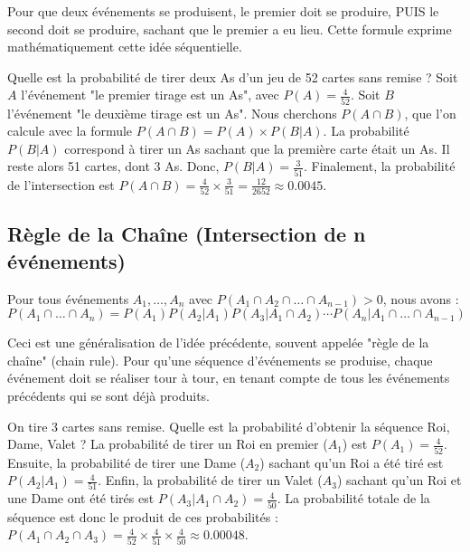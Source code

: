 \begin{intuitionbox}
Pour que deux événements se produisent, le premier doit se produire, PUIS le second doit se produire, sachant que le premier a eu lieu. Cette formule exprime mathématiquement cette idée séquentielle.
\end{intuitionbox}

\begin{examplebox}
Quelle est la probabilité de tirer deux As d'un jeu de 52 cartes sans remise ?
Soit $A$ l'événement "le premier tirage est un As", avec $P(A) = \frac{4}{52}$. Soit $B$ l'événement "le deuxième tirage est un As". Nous cherchons $P(A \cap B)$, que l'on calcule avec la formule $P(A \cap B) = P(A) \times P(B|A)$. La probabilité $P(B|A)$ correspond à tirer un As sachant que la première carte était un As. Il reste alors 51 cartes, dont 3 As. Donc, $P(B|A) = \frac{3}{51}$. Finalement, la probabilité de l'intersection est $P(A \cap B) = \frac{4}{52} \times \frac{3}{51} = \frac{12}{2652} \approx 0.0045$.
\end{examplebox}

\subsection{Règle de la Chaîne (Intersection de n événements)}

\begin{theorembox}
Pour tous événements $A_1, \dots, A_n$ avec $P(A_1 \cap A_2 \cap \dots \cap A_{n-1}) > 0$, nous avons :
$$P(A_1 \cap \dots \cap A_n) = P(A_1)P(A_2|A_1)P(A_3|A_1 \cap A_2) \cdots P(A_n|A_1 \cap \dots \cap A_{n-1})$$
\end{theorembox}

\begin{intuitionbox}
Ceci est une généralisation de l'idée précédente, souvent appelée "règle de la chaîne" (chain rule). Pour qu'une séquence d'événements se produise, chaque événement doit se réaliser tour à tour, en tenant compte de tous les événements précédents qui se sont déjà produits.
\end{intuitionbox}

\begin{examplebox}
On tire 3 cartes sans remise. Quelle est la probabilité d'obtenir la séquence Roi, Dame, Valet ?
La probabilité de tirer un Roi en premier ($A_1$) est $P(A_1) = \frac{4}{52}$.
Ensuite, la probabilité de tirer une Dame ($A_2$) sachant qu'un Roi a été tiré est $P(A_2|A_1) = \frac{4}{51}$.
Enfin, la probabilité de tirer un Valet ($A_3$) sachant qu'un Roi et une Dame ont été tirés est $P(A_3|A_1 \cap A_2) = \frac{4}{50}$.
La probabilité totale de la séquence est donc le produit de ces probabilités : $P(A_1 \cap A_2 \cap A_3) = \frac{4}{52} \times \frac{4}{51} \times \frac{4}{50} \approx 0.00048$.
\end{examplebox}

